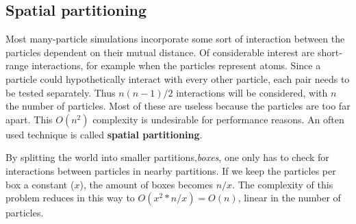 \subsection{Spatial partitioning}

Most many-particle simulations incorporate some sort of interaction between the 
particles dependent on their mutual distance. Of considerable interest are 
short-range interactions, for example when the particles represent atoms. Since 
a particle could hypothetically interact with every other particle, each pair 
needs to be tested separately. Thus $n(n-1)/2$ interactions will be considered, 
with $n$ the number of particles. Most of these are useless because the 
particles are too far apart. This $O(n^2)$ complexity is undesirable for 
performance reasons. An often used technique is called \textbf{spatial 
partitioning}.

By splitting the world into smaller partitions,\emph{boxes}, one only has to 
check for interactions between particles in nearby partitions. If we keep the 
particles per box a constant ($x$), the amount of boxes becomes $n/x$. The 
complexity of this problem reduces in this way to $O(x^2 * n/x) = O(n)$, linear 
in the number of particles.
